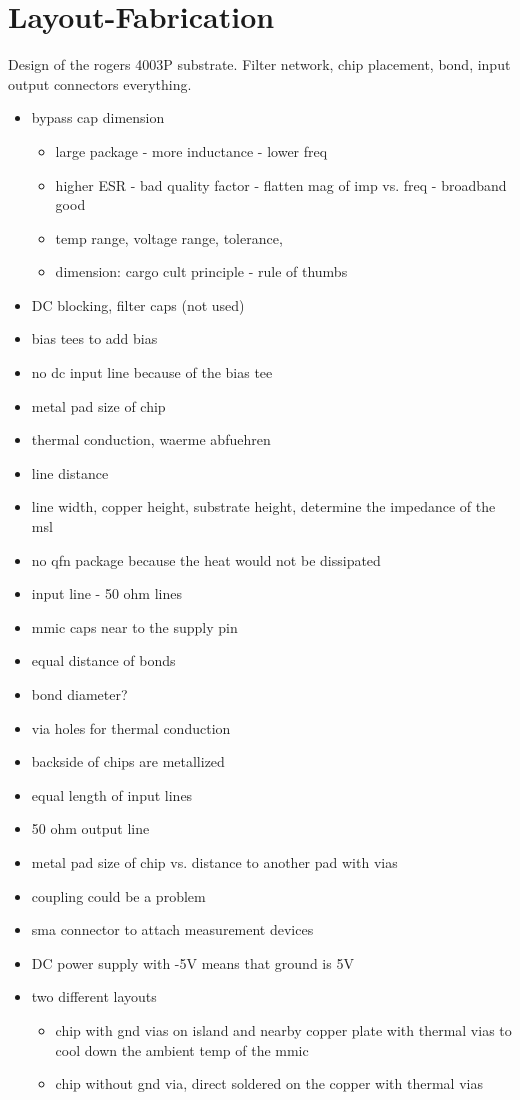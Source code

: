 \chapter{Layout-Fabrication}
Design of the rogers 4003P substrate. Filter network, chip placement, bond, input output connectors everything.
\begin{itemize}
	\item bypass cap dimension
	\begin{itemize}
		\item large package - more inductance - lower freq
		\item higher ESR - bad quality factor - flatten mag of imp vs. freq - broadband good
		\item temp range, voltage range, tolerance, 
		\item dimension: cargo cult principle - rule of thumbs
	\end{itemize}
	\item DC blocking, filter caps (not used) 
	\item bias tees to add bias 
	\item no dc input line because of the bias tee
	\item metal pad size of chip
	\item thermal conduction, waerme abfuehren
	\item line distance
	\item line width, copper height, substrate height, determine the impedance of the msl
	\item no qfn package because the heat would not be dissipated
	\item input line - 50 ohm lines
	\item mmic caps near to the supply pin
	\item equal distance of bonds
	\item bond diameter?
	\item via holes for thermal conduction
	\item backside of chips are metallized
	\item equal length of input lines
	\item 50 ohm output line
	\item metal pad size of chip vs. distance to another pad with vias
	\item coupling could be a problem
	\item sma connector to attach measurement devices
	\item DC power supply with -5V means that ground is 5V
	\item two different layouts
	\begin{itemize}
		\item chip with gnd vias on island and nearby copper plate with thermal vias to cool down the ambient temp of the mmic
		\item chip without gnd via, direct soldered on the copper with thermal vias
	\end{itemize}
\end{itemize}